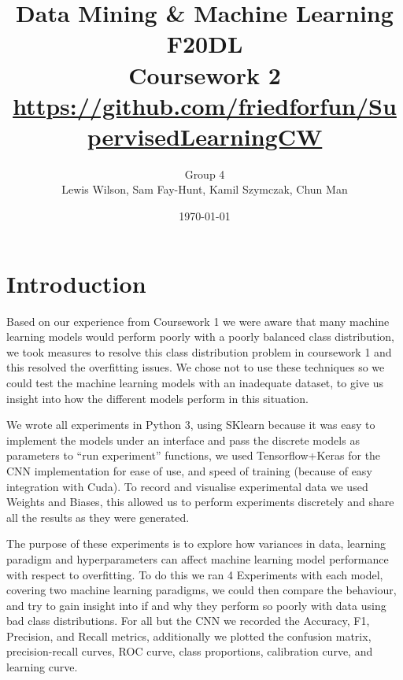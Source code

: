 \documentclass[11pt]{article}
\begin{document}
\title{\huge Data Mining \& Machine Learning F20DL \\ Coursework 2 \\
{\small{\url{https://github.com/friedforfun/SupervisedLearningCW}}}}
\author{Group 4\\Lewis Wilson, Sam Fay-Hunt, Kamil Szymczak, Chun Man }
\date{\today}
\maketitle

\newpage
\tableofcontents
\thispagestyle{empty}
\pagebreak
\setcounter{page}{1}
\newpage
\section{Introduction}
Based on our experience from Coursework 1 we were aware that many machine learning models would perform poorly with a poorly balanced class distribution, we took measures to resolve this class distribution problem in coursework 1 and this resolved the overfitting issues.
We chose not to use these techniques so we could test the machine learning models with an inadequate dataset, to give us insight into how the different models perform in this situation.

We wrote all experiments in Python 3, using SKlearn because it was easy to implement the models under an interface and pass the discrete models as parameters to “run experiment” functions, we used Tensorflow+Keras for the CNN implementation for ease of use, and speed of training (because of easy integration with Cuda). 
To record and visualise experimental data we used Weights and Biases, this allowed us to perform experiments discretely and share all the results as they were generated.\cite{WeightsBiases}

The purpose of these experiments is to explore how variances in data, learning paradigm and hyperparameters can affect machine learning model performance with respect to overfitting. 
To do this we ran 4 Experiments with each model, covering two machine learning paradigms, we could then compare the behaviour, and try to gain insight into if and why they perform so poorly with data using bad class distributions.
For all but the CNN we recorded the Accuracy, F1, Precision, and Recall metrics, additionally we plotted the confusion matrix, precision-recall curves, ROC curve, class proportions, calibration curve, and learning curve. \cite{WeightsBiases}
\end{document}
